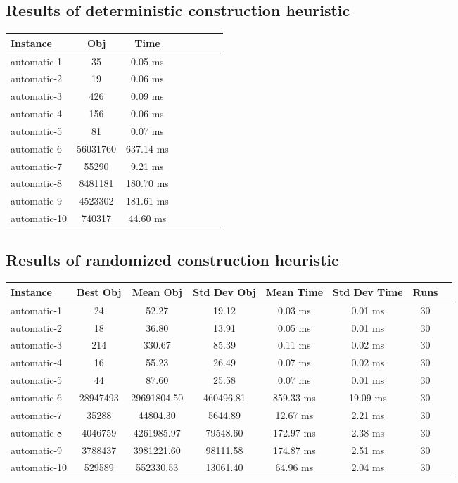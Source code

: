 \documentclass[11pt]{article}
\begin{document}
\subsection{Results of deterministic construction heuristic}
{
\center
\begin{tabular}{l*{6}{c}r}
Instance & Obj & Time \\
\hline
automatic-1 & 35 & 0.05 ms \\
automatic-2 & 19 & 0.06 ms \\
automatic-3 & 426 & 0.09 ms \\
automatic-4 & 156 & 0.06 ms \\
automatic-5 & 81 & 0.07 ms \\
automatic-6 & 56031760 & 637.14 ms \\
automatic-7 & 55290 & 9.21 ms \\
automatic-8 & 8481181 & 180.70 ms \\
automatic-9 & 4523302 & 181.61 ms \\
automatic-10 & 740317 & 44.60 ms \\
\end{tabular}
}

\subsection{Results of randomized construction heuristic}
{
\center
\begin{tabular}{l*{6}{c}r}
Instance & Best Obj & Mean Obj & Std Dev Obj & Mean Time & Std Dev Time & Runs \\
\hline
automatic-1 & 24 & 52.27 & 19.12 & 0.03 ms & 0.01 ms & 30 \\
automatic-2 & 18 & 36.80 & 13.91 & 0.05 ms & 0.01 ms & 30 \\
automatic-3 & 214 & 330.67 & 85.39 & 0.11 ms & 0.02 ms & 30 \\
automatic-4 & 16 & 55.23 & 26.49 & 0.07 ms & 0.02 ms & 30 \\
automatic-5 & 44 & 87.60 & 25.58 & 0.07 ms & 0.01 ms & 30 \\
automatic-6 & 28947493 & 29691804.50 & 460496.81 & 859.33 ms & 19.09 ms & 30 \\
automatic-7 & 35288 & 44804.30 & 5644.89 & 12.67 ms & 2.21 ms & 30 \\
automatic-8 & 4046759 & 4261985.97 & 79548.60 & 172.97 ms & 2.38 ms & 30 \\
automatic-9 & 3788437 & 3981221.60 & 98111.58 & 174.87 ms & 2.51 ms & 30 \\
automatic-10 & 529589 & 552330.53 & 13061.40 & 64.96 ms & 2.04 ms & 30 \\
\end{tabular}
}
\end{document}
